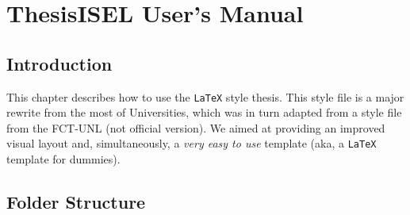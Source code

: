 % 
%  
%
\chapter{ThesisISEL User's Manual}
\label{cha:users_manual}

\section{Introduction} %
\label{sec:introduction}

This chapter describes how to use the  \texttt{LaTeX} style thesis{}. This style file is a major rewrite from the most of Universities, which was in turn adapted from a style file from the FCT-UNL (not official version).  We aimed at providing an improved visual layout and, simultaneously, a \emph{very easy to use} template (aka, a  \texttt{LaTeX} template for dummies). 

\noindent%

\section{Folder Structure} %
\label{sec:folder_structure}

